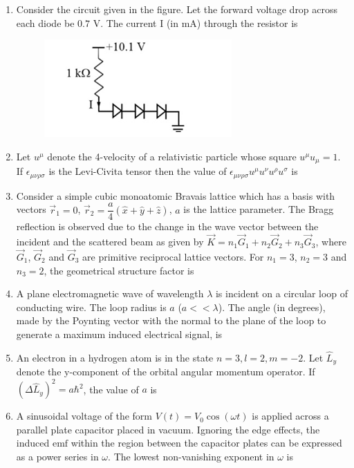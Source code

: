 \documentclass[journal,12pt,onecolumn]{IEEEtran}
\theoremstyle{remark}
\begin{document}
\begin{enumerate}
    \item Consider the circuit given in the figure. Let the forward voltage drop across each diode be $0.7$ V. The current I (in mA) through the resistor is \underline{\hspace{2cm}}
    \begin{figure}[H]
    \centering
    \includegraphics[width=0.25\columnwidth]{fig/Q42.png}
     \caption*{}
    \label{fig:Q42}
\end{figure}
    \item Let $u^\mu$ denote the 4-velocity of a relativistic particle whose square $u^\mu u_\mu = 1$. If $\epsilon_{\mu\nu\rho\sigma}$ is the Levi-Civita tensor then the value of $\epsilon_{\mu\nu\rho\sigma}u^\mu u^\nu u^\rho u^\sigma$ is \underline{\hspace{2cm}}
    \item Consider a simple cubic monoatomic Bravais lattice which has a basis with vectors $\vec{r}_1 = 0$, $\vec{r}_2 = \dfrac{a}{4}(\hat{x} + \hat{y} + \hat{z})$, $a$ is the lattice parameter. The Bragg reflection is observed due to the change in the wave vector between the incident and the scattered beam as given by $\vec{K} = n_1\vec{G}_1 + n_2\vec{G}_2 + n_3\vec{G}_3$, where $\vec{G}_1$, $\vec{G}_2$ and $\vec{G}_3$ are primitive reciprocal lattice vectors. For $n_1 = 3$, $n_2 = 3$ and $n_3 = 2$, the geometrical structure factor is \underline{\hspace{2cm}}
    
    \item A plane electromagnetic wave of wavelength $\lambda$ is incident on a circular loop of conducting wire. The loop radius is $a$ ($a << \lambda$). The angle (in degrees), made by the Poynting vector with the normal to the plane of the loop to generate a maximum induced electrical signal, is \underline{\hspace{2cm}}
    
    \item An electron in a hydrogen atom is in the state $n=3, l=2, m=-2$. Let $\hat{L}_y$ denote the y-component of the orbital angular momentum operator. If $(\Delta \hat{L}_y)^2 = a\hbar^2$, the value of $a$ is \underline{\hspace{2cm}}
    
    \item A sinusoidal voltage of the form $V(t)=V_0\cos(\omega t)$ is applied across a parallel plate capacitor placed in vacuum. Ignoring the edge effects, the induced $\mathrm{emf}$ within the region between the capacitor plates can be expressed as a power series in $\omega$. The lowest non-vanishing exponent in $\omega$ is \underline{\hspace{2cm}}
    

\end{enumerate}
\end{document}
